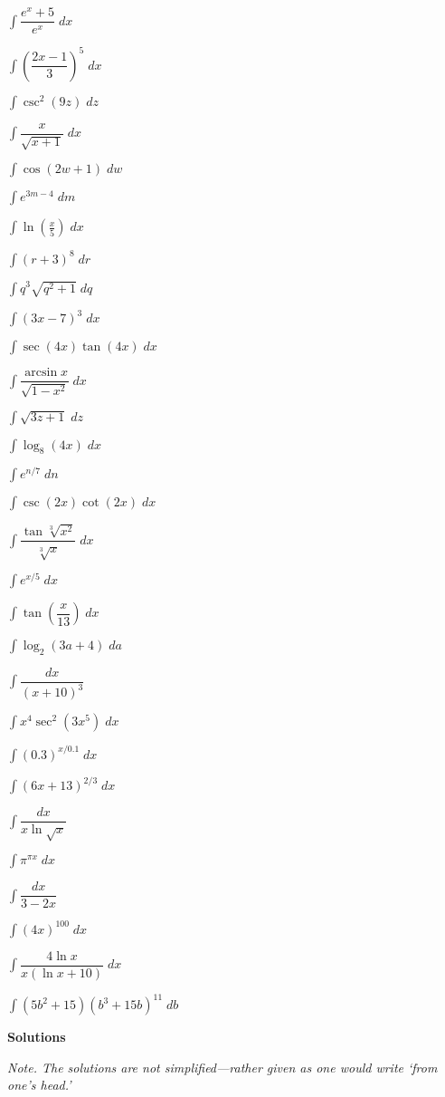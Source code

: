 \documentclass[11pt,letterpaper]{article}
\newcommand\ds{\displaystyle}
\newenvironment{3enumerate}{%
	\begin{enumerate}[(1)]
	\begin{multicols}{3}
	}{%
	\end{multicols}
	\end{enumerate}
}
\begin{document}
\begin{3enumerate}
\item $\ds\int \dfrac{e^x + 5}{e^x} \;dx$
\item $\ds\int \left( \dfrac{2x - 1}{3} \right)^5 \;dx$
\item $\ds\int \csc^2(9z) \;dz$
\item $\ds\int \dfrac{x}{\sqrt{x + 1}} \;dx$
\item $\ds\int \cos(2w + 1) \;dw$
\item $\ds\int e^{3m - 4} \;dm$
\item $\ds\int \ln\left( \frac{x}{5} \right) \;dx$
\item $\ds\int (r + 3)^8 \;dr$
\item $\ds\int q^3 \sqrt{q^2 + 1} \;dq$
\item $\ds\int (3x - 7)^3 \;dx$
\item $\ds\int \sec(4x) \tan(4x) \;dx$
\item $\ds\int \dfrac{\arcsin x}{\sqrt{1 - x^2}} \;dx$
\item $\ds\int \sqrt{3z + 1} \;dz$
\item $\ds\int \log_8(4x) \;dx$
\item $\ds\int e^{n/7} \;dn$
\item $\ds\int \csc(2x) \cot(2x) \;dx$
\item $\ds\int \dfrac{\tan \sqrt[3]{x^2}}{\sqrt[3]{x}} \;dx$
\item $\ds\int e^{x/5} \;dx$
\item $\ds\int \tan\left( \dfrac{x}{13} \right) \;dx$
\item $\ds\int \log_2(3a + 4) \;da$
\item $\ds\int \dfrac{dx}{(x + 10)^3}$
\item $\ds\int x^4 \sec^2(3x^5) \;dx$
\item $\ds\int (0.3)^{x/0.1} \;dx$
\item $\ds\int (6x + 13)^{2/3} \;dx$
\item $\ds\int \dfrac{dx}{x \ln \sqrt{x}}$
\item $\ds\int \pi^{\pi x} \;dx$
\item $\ds\int \dfrac{dx}{3 - 2x}$
\item $\ds\int (4x)^{100} \;dx$
\item $\ds\int \dfrac{4\ln x}{x(\ln x + 10)} \;dx$
\item $\ds\int (5b^2 + 15)(b^3 + 15b)^{11} \;db$
\end{3enumerate}

\newpage

	\begin{center} {\bfseries\Large Solutions} \end{center}
{\itshape Note. The solutions are not simplified---rather given as one would write `from one's head.'}
\end{document}
